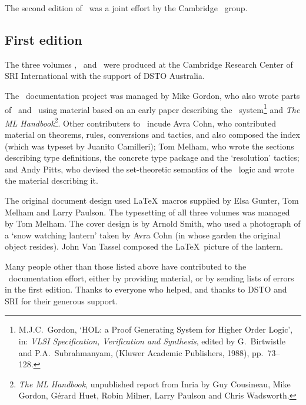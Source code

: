 The second edition of \REFERENCE\ was a joint effort by the Cambridge
\HOL\ group.

\subsection*{First edition}

The three volumes \TUTORIAL, \DESCRIPTION\ and \REFERENCE\ were
produced at the Cambridge Research Center of SRI International with
the support of DSTO Australia.

The \HOL\ documentation project was managed by Mike Gordon, who also
wrote parts of \DESCRIPTION\ and \TUTORIAL\ using material based on an
early paper describing the \HOL\ system\footnote{M.J.C.\ Gordon, `HOL:
  a Proof Generating System for Higher Order Logic', in: {\it VLSI
    Specification, Verification and Synthesis\/}, edited by G.\
  Birtwistle and P.A.\ Subrahmanyam, (Kluwer Academic Publishers,
  1988), pp.\ 73--128.} and {\sl The ML Handbook\/}\footnote{{\sl The
    ML Handbook}, unpublished report from Inria by Guy Cousineau, Mike
  Gordon, G\'erard Huet, Robin Milner, Larry Paulson and Chris
  Wadsworth.}.  Other contributers to \DESCRIPTION\ incude Avra Cohn,
who contributed material on theorems, rules, conversions and tactics,
and also composed the index (which was typeset by Juanito Camilleri);
Tom Melham, who wrote the sections describing type definitions, the
concrete type package and the `resolution' tactics; and Andy Pitts,
who devised the set-theoretic semantics of the \HOL\ logic and wrote
the material describing it.

The original document design used \LaTeX\ macros supplied by Elsa
Gunter, Tom Melham and Larry Paulson.  The typesetting of all three
volumes was managed by Tom Melham.  The cover design is by Arnold
Smith, who used a photograph of a `snow watching lantern' taken by
Avra Cohn (in whose garden the original object resides).  John Van
Tassel composed the \LaTeX\ picture of the lantern.

Many people other than those listed above have contributed to the
\HOLW\ documentation effort, either by providing material, or by
sending lists of errors in the first edition.  Thanks to everyone who
helped, and thanks to DSTO and SRI for their generous support.







